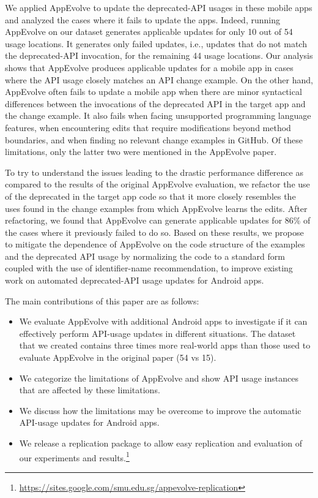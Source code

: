 We applied AppEvolve to update the deprecated-API usages in these mobile
apps and analyzed the cases where it fails to update the apps. Indeed,
running AppEvolve on our dataset generates applicable updates for only 10
out of 54 usage locations.  It generates only failed updates, i.e., updates
that do not match the deprecated-API invocation, for the remaining 44 usage
locations. Our analysis shows that AppEvolve produces applicable updates
for a mobile app in cases where the API usage closely matches an API change
example.  On the other hand, AppEvolve often fails to update a mobile app
when there are minor syntactical differences between the invocations of the
deprecated API in the target app and the change example.  It also fails
when facing unsupported 
programming language features, when encountering edits that require
modifications beyond method boundaries, and when finding no relevant change
examples in GitHub.  Of these limitations, only the latter two were
mentioned in the AppEvolve paper.

To try to understand the issues leading to the drastic performance
difference as compared to the results of the original AppEvolve evaluation,
we refactor the use of the deprecated in the target app code so that it
more closely resembles the uses found in the change examples from which
AppEvolve learns the edits.  After refactoring, we found that AppEvolve can
generate applicable updates for 86\% of the cases where it previously
failed to do so.  Based on these results, we propose to mitigate the
dependence of AppEvolve on the code structure of the examples and the
deprecated API usage by normalizing the code to a standard form coupled
with the use of identifier-name recommendation, to improve existing work on
automated deprecated-API usage updates for Android apps.

The main contributions of this paper are as follows:
\begin{itemize}
	\item We  evaluate AppEvolve with additional Android apps to investigate if it can effectively perform API-usage updates in different situations. The dataset that we created contains three times more real-world apps than those used to evaluate AppEvolve in the original paper (54 vs 15).
	\item We categorize the limitations of AppEvolve and show API usage
	instances that are affected by these limitations.
	\item We discuss how the limitations may be overcome to improve the automatic API-usage updates for Android apps.
	\item We release a replication package to allow easy replication
	and evaluation of our experiments and results.\footnote{\url{https://sites.google.com/smu.edu.sg/appevolve-replication}}
\end{itemize}

